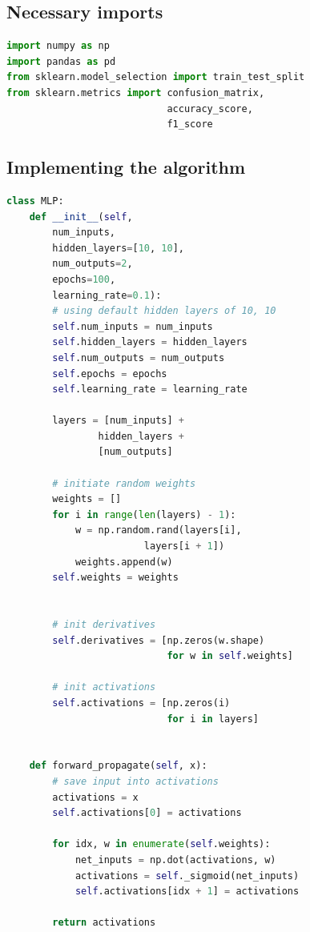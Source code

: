 \subsection{Necessary imports}
\begin{lstlisting}[language=Python]
import numpy as np
import pandas as pd
from sklearn.model_selection import train_test_split
from sklearn.metrics import confusion_matrix, 
                            accuracy_score, 
                            f1_score
\end{lstlisting}
\subsection{Implementing the algorithm}
\begin{lstlisting}[language=Python]
    class MLP:
    def __init__(self, 
        num_inputs, 
        hidden_layers=[10, 10], 
        num_outputs=2, 
        epochs=100, 
        learning_rate=0.1):
        # using default hidden layers of 10, 10
        self.num_inputs = num_inputs
        self.hidden_layers = hidden_layers
        self.num_outputs = num_outputs
        self.epochs = epochs
        self.learning_rate = learning_rate

        layers = [num_inputs] + 
                hidden_layers + 
                [num_outputs]

        # initiate random weights 
        weights = []
        for i in range(len(layers) - 1):
            w = np.random.rand(layers[i], 
                        layers[i + 1])
            weights.append(w)
        self.weights = weights


        # init derivatives
        self.derivatives = [np.zeros(w.shape) 
                            for w in self.weights]

        # init activations  
        self.activations = [np.zeros(i) 
                            for i in layers]


    def forward_propagate(self, x):
        # save input into activations
        activations = x 
        self.activations[0] = activations

        for idx, w in enumerate(self.weights):
            net_inputs = np.dot(activations, w)
            activations = self._sigmoid(net_inputs)
            self.activations[idx + 1] = activations

        return activations



\end{lstlisting}
